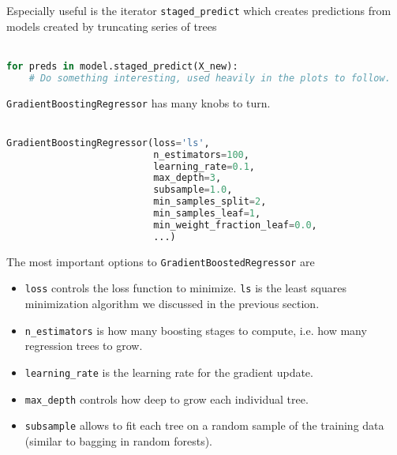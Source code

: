 \begin{frame}[fragile]
Especially useful is the iterator \texttt{staged\_predict} which creates predictions from models created by truncating series of trees\\~\\

\begin{lstlisting}[language=python]
for preds in model.staged_predict(X_new):
    # Do something interesting, used heavily in the plots to follow.
\end{lstlisting}

\end{frame}
%
\begin{frame}[fragile]

\texttt{GradientBoostingRegressor} has many knobs to turn.\\~\\

\begin{lstlisting}[language=python]
GradientBoostingRegressor(loss='ls',
                          n_estimators=100, 
                          learning_rate=0.1,
                          max_depth=3,
                          subsample=1.0, 
                          min_samples_split=2, 
                          min_samples_leaf=1, 
                          min_weight_fraction_leaf=0.0,
                          ...)
\end{lstlisting}

\end{frame}
%
\begin{frame}[fragile]
The most important options to \texttt{GradientBoostedRegressor} are

\begin{itemize}
  \item \texttt{loss} controls the loss function to minimize.  \texttt{ls} is the least squares minimization algorithm we discussed in the previous section.
  \item \texttt{n\_estimators} is how many boosting stages to compute, i.e. how many regression trees to grow.
  \item \texttt{learning\_rate} is the learning rate for the gradient update.
  \item \texttt{max\_depth} controls how deep to grow each individual tree.
  \item \texttt{subsample} allows to fit each tree on a random sample of the training data (similar to bagging in random forests).
\end{itemize}

\end{frame}
